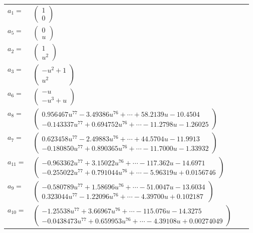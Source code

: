 \documentclass[1p]{elsarticle_modified}
\theoremstyle{definition}
\begin{document}
\begin{tabular}{m{7pt} m{180pt} m{7pt} m{180pt} }
\flushright $a_{1}=$&$\begin{pmatrix}1\\0\end{pmatrix}$ \\
\flushright $a_{5}=$&$\begin{pmatrix}0\\u\end{pmatrix}$ \\
\flushright $a_{2}=$&$\begin{pmatrix}1\\u^2\end{pmatrix}$ \\
\flushright $a_{3}=$&$\begin{pmatrix}- u^2+1\\u^2\end{pmatrix}$ \\
\flushright $a_{6}=$&$\begin{pmatrix}- u\\- u^3+u\end{pmatrix}$ \\
\flushright $a_{8}=$&$\begin{pmatrix}0.956467 u^{77}-3.49386 u^{76}+\cdots+58.2139 u-10.4504\\-0.143337 u^{77}+0.694752 u^{76}+\cdots-11.2798 u-1.26025\end{pmatrix}$ \\
\flushright $a_{7}=$&$\begin{pmatrix}0.623458 u^{77}-2.49883 u^{76}+\cdots+44.5704 u-11.9913\\-0.180850 u^{77}+0.890365 u^{76}+\cdots-11.7000 u-1.33932\end{pmatrix}$ \\
\flushright $a_{11}=$&$\begin{pmatrix}-0.963362 u^{77}+3.15022 u^{76}+\cdots-117.362 u-14.6971\\-0.255022 u^{77}+0.791044 u^{76}+\cdots-5.96319 u+0.0156746\end{pmatrix}$ \\
\flushright $a_{9}=$&$\begin{pmatrix}-0.580789 u^{77}+1.58696 u^{76}+\cdots-51.0047 u-13.6034\\0.323044 u^{77}-1.22096 u^{76}+\cdots-4.39700 u+0.102187\end{pmatrix}$ \\
\flushright $a_{10}=$&$\begin{pmatrix}-1.25538 u^{77}+3.66967 u^{76}+\cdots-115.076 u-14.3275\\-0.0438473 u^{77}+0.659953 u^{76}+\cdots-4.39108 u+0.00274049\end{pmatrix}$ \\

\end{tabular}
\end{document}
